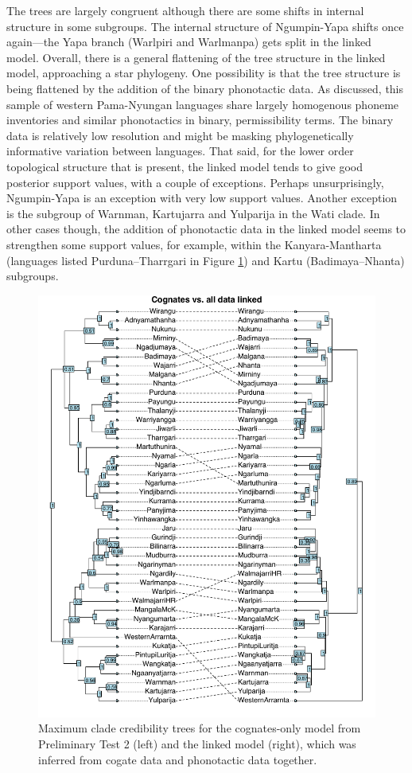 \documentclass[]{article}
\begin{document}
The trees are largely congruent although there are some shifts in internal structure in some subgroups. The internal structure of Ngumpin-Yapa shifts once again---the Yapa branch (Warlpiri and Warlmanpa) gets split in the linked model. Overall, there is a general flattening of the tree structure in the linked model, approaching a star phylogeny. One possibility is that the tree structure is being flattened by the addition of the binary phonotactic data. As discussed, this sample of western Pama-Nyungan languages share largely homogenous phoneme inventories and similar phonotactics in binary, permissibility terms. The binary data is relatively low resolution and might be masking phylogenetically informative variation between languages. That said, for the lower order topological structure that is present, the linked model tends to give good posterior support values, with a couple of exceptions. Perhaps unsurprisingly, Ngumpin-Yapa is an exception with very low support values. Another exception is the subgroup of Warnman, Kartujarra and Yulparija in the Wati clade. In other cases though, the addition of phonotactic data in the linked model seems to strengthen some support values, for example, within the Kanyara-Mantharta (languages listed Purduna--Tharrgari in Figure \ref{fig:cogs-vs-linked-all}) and Kartu (Badimaya--Nhanta) subgroups.

\begin{figure}
\centering
\includegraphics{fig/cogs_vs_linked_all.pdf}
\caption{\label{fig:cogs-vs-linked-all}Maximum clade credibility trees for the cognates-only model from Preliminary Test 2 (left) and the linked model (right), which was inferred from cogate data and phonotactic data together.}
\end{figure}
\end{document}

